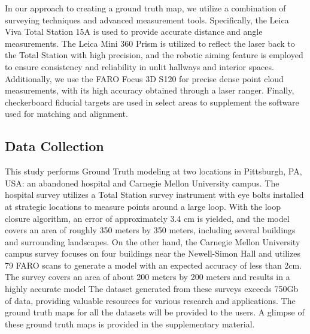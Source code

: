 \documentclass[10pt,twocolumn,letterpaper]{article}
\begin{document}
In our approach to creating a ground truth map, we utilize a combination of surveying techniques and advanced measurement tools. Specifically, the Leica Viva Total Station 15A is used to provide accurate distance and angle measurements. The Leica Mini 360 Prism is utilized to reflect the laser back to the Total Station with high precision, and the robotic aiming feature is employed to ensure consistency and reliability in unlit hallways and interior spaces. Additionally, we use the FARO Focus 3D S120 for precise dense point cloud measurements, with its high accuracy obtained through a laser ranger. Finally, checkerboard fiducial targets are used in select areas to supplement the software used for matching and alignment.
\subsection{Data Collection}



This study performs Ground Truth modeling at two locations in Pittsburgh, PA, USA: an abandoned hospital and Carnegie Mellon University campus. The hospital survey utilizes a Total Station survey instrument with eye bolts installed at strategic locations to measure points around a large loop. With the loop closure algorithm, an error of approximately 3.4 cm is yielded, and the model covers an area of roughly 350 meters by 350 meters, including several buildings and surrounding landscapes. 
On the other hand, the Carnegie Mellon University campus survey focuses on four buildings near the Newell-Simon Hall and utilizes 79 FARO scans to generate a model with an expected accuracy of less than 2cm. The survey covers an area of about 200 meters by 200 meters and results in a highly accurate model 
The dataset generated from these surveys exceeds 750Gb of data, providing valuable resources for various research and applications. The ground truth maps for all the datasets will be provided to the users. A glimpse of these ground truth maps is provided in the supplementary material.
\end{document}
